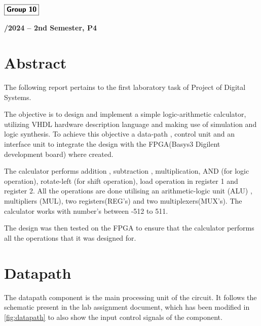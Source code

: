 \documentclass[12pt]{article}
\begin{document}
\begin{flushleft}
    \large $\boxed{\text{\bf \fontfamily{cmss}\selectfont Group 10}}$\\[4.0cm]
\end{flushleft}
    
\begin{center}
    \large \bf {}/2024 -- 2nd Semester, P4
\end{center}

\thispagestyle{empty}

\setcounter{page}{0}

\newpage

\tableofcontents 

\newpage

\section{Abstract}
The following report pertains to the first laboratory task of Project of Digital Systems.

The objective is to design and implement a simple logic-arithmetic calculator, utilizing VHDL hardware description language and making use of simulation and logic synthesis. 
To achieve this objective a data-path , control unit and an interface
unit to integrate the design with the FPGA(Basys3 Digilent development board) where created. 

The calculator performs addition , subtraction , multiplication, AND (for logic operation), rotate-left  (for shift operation), load operation in register 1 and register 2. All the operations are done utilising an arithmetic-logic unit (ALU) , multipliers (MUL), two registers(REG's) and two multiplexers(MUX's). The calculator works with number's between -512 to 511. 

The design was then tested on the FPGA to ensure that the calculator performs all the operations that it was designed for.

\section{Datapath}

The datapath component is the main processing unit of the circuit. It follows the schematic present in the lab assignment document, which has been modified in \ref{fig:datapath} to also show the input control signals of the component.
\end{document}
